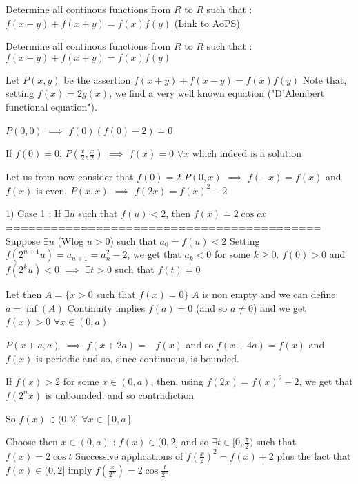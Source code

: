 \begin{problem}
	Determine all continous functions from $R$ to $R$ such that : $f(x-y)+f(x+y)=f(x)f(y)$
	\flushright \href{https://artofproblemsolving.com/community/c6h562475}{(Link to AoPS)}
\end{problem}



\begin{solution}
	\begin{tcolorbox}Determine all continous functions from $R$ to $R$ such that : $f(x-y)+f(x+y)=f(x)f(y)$\end{tcolorbox}
Let $P(x,y)$ be the assertion $f(x+y)+f(x-y)=f(x)f(y)$
Note that, setting $f(x)=2g(x)$, we find a very well known equation ("D'Alembert functional equation").

$P(0,0)$ $\implies$ $f(0)(f(0)-2)=0$ 

If $f(0)=0$, $P(\frac x2,\frac x2)$ $\implies$ $\boxed{f(x)=0}$ $\forall x$ which indeed is a solution

Let us from now consider that $f(0)=2$
$P(0,x)$ $\implies$ $f(-x)=f(x)$ and $f(x)$ is even.
$P(x,x)$ $\implies$ $f(2x)=f(x)^2-2$

1) Case 1 : If $\exists u$ such that $f(u)<2$, then $f(x)=2\cos cx$
==========================================
Suppose $\exists u$ (Wlog $u>0$) such that $a_0=f(u)<2$
Setting $f(2^{n+1}u)=a_{n+1}=a_n^2-2$, we get that $a_k<0$ for some $k\ge 0$.
$f(0)>0$ and $f(2^ku)<0$ $\implies$ $\exists t>0$ such that $f(t)=0$

Let then $A=\{x>0$ such that $f(x)=0\}$
$A$ is non empty and we can define $a=\inf(A)$
Continuity implies $f(a)=0$ (and so $a\ne 0$) and we get $f(x)>0$ $\forall x\in (0,a)$

$P(x+a,a)$ $\implies$ $f(x+2a)=-f(x)$ and so $f(x+4a)=f(x)$ and $f(x)$ is periodic and so, since continuous, is bounded.

If $f(x)>2$ for some $x\in(0,a)$, then, using $f(2x)=f(x)^2-2$, we get that $f(2^nx)$ is unbounded, and so contradiction

So $f(x)\in (0,2]$ $\forall x\in [0,a]$

Choose then $x\in(0,a)$ : $f(x)\in (0,2]$ and so $\exists t\in[0,\frac{\pi}2)$ such that $f(x)=2\cos t$
Successive applications of $f(\frac x2)^2=f(x)+2$ plus the fact that $f(x)\in (0,2]$ imply $f(\frac x{2^n})=2\cos \frac t{2^n}$


\end{solution}
